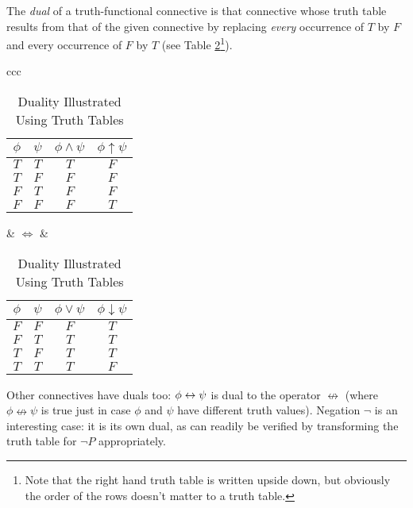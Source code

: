 \begin{definition}[Duality]
The \emph{dual} of a truth-functional connective is that connective whose truth table results from that of the given connective by replacing \emph{every} occurrence of $T$ by $F$ and every occurrence of $F$ by $T$ (see Table \ref{tthree}\footnote{Note that the right hand truth table is written upside down, but obviously the order of the rows doesn't matter to a truth table.}).
\end{definition}
\begin{table}[b]\centering\begin{tabular}{ccc}
{    \begin{tabular}{cc|c|c}
\toprule
$\phi$ & $\psi$ & $\phi \wedge \psi$ & $\phi \uparrow \psi$ \\
\midrule
$T$ & $T$ & $T$ &$F$\\
$T$ & $F$ & $F$&$F$\\
$F$ & $T$ & $F$ &$F$\\
$F$ & $F$ & $F$ &$T$\\
\bottomrule
	\end{tabular}} &
$\Leftrightarrow$ &
{	\begin{tabular}{cc|c|c}
\toprule
$\phi$ & $\psi$ & $\phi \vee \psi$ & $\phi\downarrow\psi$ \\
\midrule
$F$ & $F$ & $F$ &$T$\\
$F$ & $T$ & $T$ &$T$\\
$T$ & $F$ & $T$ &$T$\\
$T$ & $T$ & $T$	&$F$\\
\bottomrule
\end{tabular}
}    \end{tabular}\caption{Duality Illustrated Using Truth Tables\label{tthree}}\end{table}
Other connectives have duals too: $\phi \leftrightarrow \psi$ is dual to the operator $\nleftrightarrow$ (where $\phi \nleftrightarrow\psi$ is true just in case $\phi$ and $\psi$ have different truth values). Negation $¬$ is an interesting case: it is its own dual, as can readily be verified by transforming the truth table for $¬P$ appropriately.


